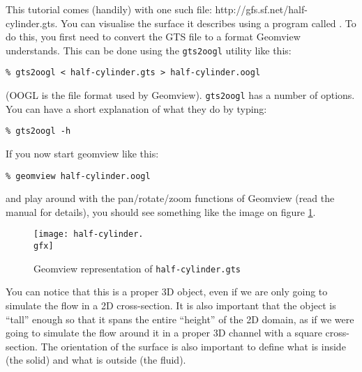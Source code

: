 \documentclass[a4paper]{article}
\begin{document}
This tutorial comes (handily) with one such file:
{http://gfs.sf.net/half-cylinder.gts}. You can
visualise the surface it describes using a program
called
. To do this,
you first need to convert the {\sc GTS} file to a format Geomview
understands. This can be done using the {\tt gts2oogl} utility like
this:
\begin{verbatim}
% gts2oogl < half-cylinder.gts > half-cylinder.oogl
\end{verbatim}
({\sc OOGL} is the file format used by Geomview). {\tt gts2oogl} has a
number of options. You can have a short explanation of what they do by 
typing:
\begin{verbatim}
% gts2oogl -h
\end{verbatim}
If you now start geomview like this:
\begin{verbatim}
% geomview half-cylinder.oogl
\end{verbatim}
and play around with the pan/rotate/zoom functions of Geomview (read the
manual for details), you should see something like the image on figure 
\ref{half-cylinder}.
\begin{figure}[htbp]
\begin{center}
\texttt{[image: half-cylinder.\\gfx]}
\end{center}
\caption{Geomview representation of {\tt half-cylinder.gts}}
\label{half-cylinder}
\end{figure}
You can notice that this is a proper 3D object, even if we are only
going to simulate the flow in a 2D cross-section. It is also important 
that the object is ``tall'' enough so that it spans the entire
``height'' of the 2D domain, as if we were going to simulate the flow
around it in a proper 3D channel with a square cross-section. The
orientation of the surface is also important to define what is inside
(the solid) and what is outside (the fluid).
\end{document}
